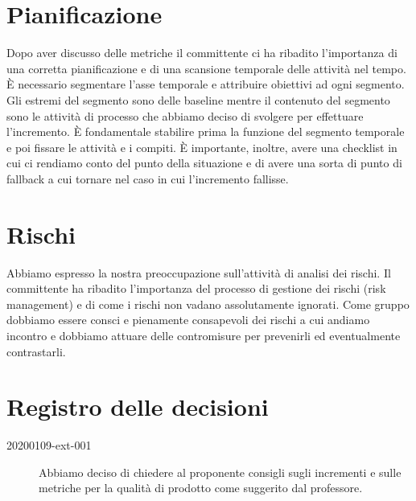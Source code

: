\documentclass{article}
\begin{document}
\section{Pianificazione}%
\label{sec:pianificazione}

Dopo aver discusso delle metriche il committente ci ha ribadito l'importanza di una corretta pianificazione e di una scansione temporale delle attività nel tempo. È necessario segmentare l'asse temporale e attribuire obiettivi ad ogni segmento. Gli estremi del segmento sono delle baseline mentre il contenuto del segmento sono le attività di processo che abbiamo deciso di svolgere per effettuare l'incremento. È fondamentale stabilire prima la funzione del segmento temporale e poi fissare le attività e i compiti. È importante, inoltre, avere una checklist in cui ci rendiamo conto del punto della situazione e di avere una sorta di punto di fallback a cui tornare nel caso in cui l'incremento fallisse.

\section{Rischi}%
\label{sec:rischi}

Abbiamo espresso la nostra preoccupazione sull'attività di analisi dei rischi. Il committente ha ribadito l'importanza del processo di gestione dei rischi (risk management) e di come i rischi non vadano assolutamente ignorati. Come gruppo dobbiamo essere consci e pienamente consapevoli dei rischi a cui andiamo incontro e dobbiamo attuare delle contromisure per prevenirli ed eventualmente contrastarli.
\newpage
\section{Registro delle decisioni}%
\label{sec:registro_delle_decisioni}

\begin{description}
  \item[20200109-ext-001] Abbiamo deciso di chiedere al proponente consigli sugli incrementi e sulle metriche per la qualità di prodotto come suggerito dal professore.
 
\end{description}

\end{document}

